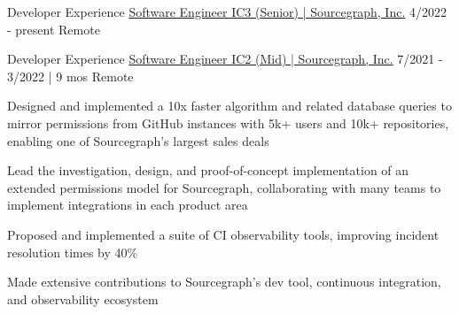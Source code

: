 
\begin{cventries}
  \cventry
    {Developer Experience} %
    {\href{https://bobheadxi.dev/experience/sourcegraph}{Software Engineer IC3 (Senior) | Sourcegraph, Inc.}} %
    {4/2022 - present} %
    {Remote} %
    {
    }

  \cventry
    {Developer Experience}
    {\href{https://bobheadxi.dev/experience/sourcegraph}{Software Engineer IC2 (Mid) | Sourcegraph, Inc.}} %
    {7/2021 - 3/2022 | 9 mos} %
    {Remote} %
    {
        \begin{cvitems}
          \item {Designed and implemented a 10x faster algorithm and related database queries to mirror permissions from GitHub instances with 5k+ users and 10k+ repositories, enabling one of Sourcegraph's largest sales deals}
          \item {Lead the investigation, design, and proof-of-concept implementation of an extended permissions model for Sourcegraph, collaborating with many teams to implement integrations in each product area}
          \item {Proposed and implemented a suite of CI observability tools, improving incident resolution times by 40\%}
          \item {Made extensive contributions to Sourcegraph's dev tool, continuous integration, and observability ecosystem}
        \end{cvitems}
    }


\end{cventries}
